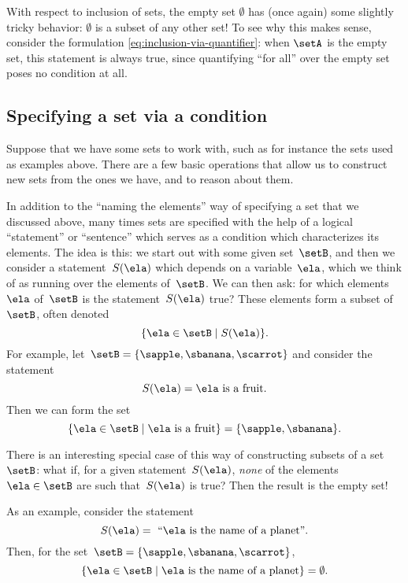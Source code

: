 With respect to inclusion of sets, the empty set $\emptyset$ has (once again) some slightly tricky behavior: $\emptyset$ is a subset of any other set!
To see why this makes sense, consider the formulation \cref{eq:inclusion-via-quantifier}: when $\setA$ is the empty set, this statement is always true, since quantifying ``for all'' over the empty set poses no condition at all.

\subsection{Specifying a set via a condition}

Suppose that we have some sets to work with, such as for instance the sets used as examples above.
There are a few basic operations that allow us to construct new sets from the ones we have, and to reason about them.

In addition to the ``naming the elements'' way of specifying a set that we discussed above, many times sets are specified with the help of a logical ``statement'' or ``sentence'' which serves as a condition which characterizes its elements.
The idea is this: we start out with some given set~$\setB$, and then we consider a statement~$S(\ela)$ which depends on a variable~$\ela$, which we think of as running over the elements of~$\setB$.
We can then ask: for which elements~$\ela$ of~$\setB$ is the statement~$S(\ela)$ true?
These elements form a subset of~$\setB$, often denoted
%
\begin{equation}
    \label{eq:axiom-specialization}
    \{ \ela \in \setB \mid S(\ela) \}.
\end{equation}
%
For example, let~$\setB = \{ \sapple, \sbanana, \scarrot \}$ and consider the statement
%
\begin{equation*}
    S(\ela) =  \ela \text{ is a fruit}.
\end{equation*}
%
Then we can form the set
%
\begin{equation*}
    \{ \ela \in \setB \mid \ela \text{ is a fruit} \} = \{ \sapple, \sbanana \}.
\end{equation*}

There is an interesting special case of this way of constructing subsets of a set~$\setB$:
what if, for a given statement~$S(\ela)$, \emph{none} of the elements~$\ela \in \setB$ are such that~$S(\ela)$ is true?
Then the result is the empty set!

As an example, consider the statement
%
\begin{equation*}
    S(\ela) =\text{ ``} \ela \text{ is the name of a planet''}.
\end{equation*}
%
Then, for the set~$\setB = \{ \sapple, \sbanana, \scarrot \}$,
\begin{equation*}
    \{ \ela \in \setB \mid \ela \text{ is the name of a planet} \} = \emptyset.
\end{equation*}

